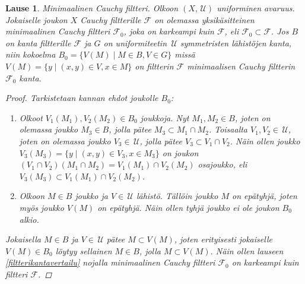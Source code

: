 \documentclass[12pt,a4paper,leqno]{report}
\newcommand{\U}{\,\mathcal{U}}
\newcommand{\F}{\mathcal{F}}
\theoremstyle{plain}
\newtheorem{lause}[equation]{Lause}
\theoremstyle{definition}
\newtheorem{maar}[equation]{Määritelmä}
\theoremstyle{remark}
\begin{document}
\begin{lause}
\emph{Minimaalinen Cauchy filtteri.} 
Olkoon $(X,\U)$ uniforminen avaruus. 
Jokaiselle joukon $X$ Cauchy filtterille $\F$ on olemassa yksikäsitteinen 
minimaalinen Cauchy filtteri $\F_0$, joka on karkeampi kuin $\F$, 
eli $\F_0\subset \F$. 
Jos $B$ on kanta filtterille $\F$ ja $G$ on uniformiteetin $\U$ symmetristen lähistöjen kanta, 
niin kokoelma $B_0=\{V(M)\mid M\in B,V\in G\}$ 
missä $V(M)=\{ y\mid (x,y)\in V,x\in M \}$ on 
filtterin $\F$ minimaalisen Cauchy filtterin $\F_0$ kanta. 
\begin{proof}
Tarkistetaan kannan ehdot joukolle $B_0$:
\begin{enumerate}
\item Olkoot $V_1(M_1),V_2(M_2)\in B_0$ joukkoja. 
Nyt $M_1,M_2\in B$, joten on olemassa joukko $M_3\in B$, 
jolla pätee $M_3\subset M_1\cap M_2$. 
Toisaalta $V_1,V_2\in \U$, joten on olemassa joukko $V_3\in\U$, 
jolla pätee $V_3\subset V_1\cap V_2$. 
Näin ollen joukko $ V_3(M_3)=\{ y\mid (x,y)\in V_3, x\in M_3 \}$ on joukon 
$(V_1\cap V_2)(M_1\cap M_2)= V_1(M_1)\cap V_2(M_2)$ osajoukko, 
eli $ V_3(M_3)\subset V_1(M_1)\cap V_2(M_2)$.
\item Olkoon $M\in B$ joukko ja $V\in \U$ lähistö. 
Tällöin joukko $M$ on epätyhjä, joten myös joukko $V(M)$ on epätyhjä. 
Näin ollen tyhjä joukko ei ole joukon $B_0$ alkio.
\end{enumerate}
Jokaisella $M\in B$ ja $V\in \U$ pätee $M\subset V(M)$, 
joten erityisesti jokaiselle $V(M)\in B_0$ löytyy sellainen $M\in B$, 
jolla $M\subset V(M)$. 
Näin ollen lauseen \ref{filtterikantavertailu} nojalla 
minimaalinen Cauchy filtteri $\F_0$ on karkeampi kuin filtteri $\F$.
\end{proof}
\end{lause}
%
%
%
\end{document}
